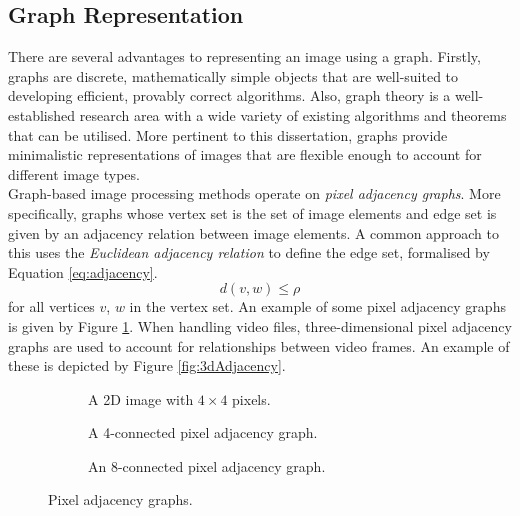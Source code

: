 \subsection{Graph Representation}
\label{sec:graphReps}
\setlength{\leftskip}{0.5cm}
\indent \indent
There are several advantages to representing an image using a graph. Firstly, graphs are discrete, mathematically simple objects that are well-suited to developing efficient, provably correct algorithms. Also, graph theory is a well-established research area with a wide variety of existing algorithms and theorems that can be utilised. More pertinent to this dissertation, graphs provide minimalistic representations of images that are flexible enough to account for different image types.
\smallskip \\ \indent
Graph-based image processing methods operate on \textit{pixel adjacency graphs}. More specifically, graphs whose vertex set is the set of image elements and edge set is given by an adjacency relation between image elements. A common approach to this uses the \textit{Euclidean adjacency relation} to define the edge set, formalised by Equation \ref{eq:adjacency}.
\begin{equation}
    d(v, w) \leq \rho
\end{equation}
for all vertices $v$, $w$ in the vertex set.  An example of some pixel adjacency graphs is given by Figure \ref{fig:pixelAdjacency}. When handling video files, three-dimensional pixel adjacency graphs are used to account for relationships between video frames. An example of these is depicted by Figure \ref{fig:3dAdjacency}.
\begin{figure}[h!]
    \centering
    \begin{subfigure}[b]{0.29\textwidth}
        \centering
        \captionsetup{justification=centering}
        \scalebox{1}{}
        \caption{A 2D image with $4 \times 4$ pixels.}
    \end{subfigure} \hfill%
    \begin{subfigure}[b]{0.29\textwidth}
        \centering
        \captionsetup{justification=centering}
        \scalebox{1}{}
        \caption{A 4-connected pixel adjacency graph.}
    \end{subfigure} \hfill%
    \begin{subfigure}[b]{0.29\textwidth}
        \centering
        \captionsetup{justification=centering}
        \scalebox{1}{}
        \caption{An 8-connected pixel adjacency graph.}
    \end{subfigure}%
    \caption[Pixel Adjacency Graphs]{Pixel adjacency graphs.}
    \label{fig:pixelAdjacency}
\end{figure}
